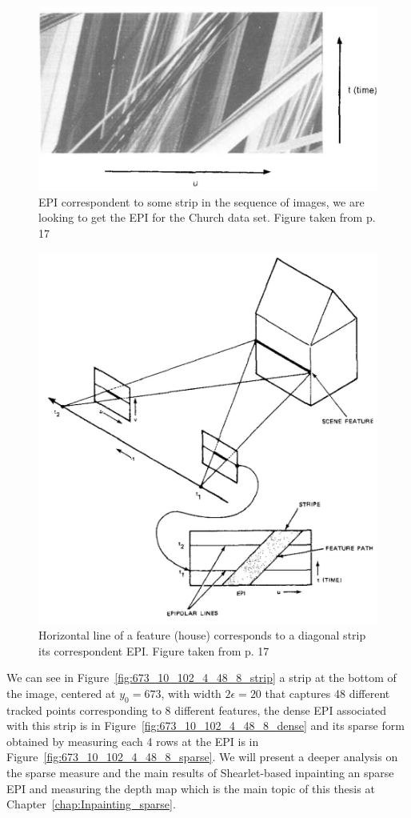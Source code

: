 \begin{figure}[h!]
\centering
\includegraphics[width = 0.8 \textwidth]{./Diagrams/EPI_bolles.jpg}
\caption{EPI correspondent to some strip in the sequence of images, we are looking to get the EPI for the Church data set. Figure taken from \cite{Bolles} p. 17}
\label{EPI_bolles}
\end{figure}

\begin{figure}[h!]
\centering
\includegraphics[width = 0.6 \textwidth]{./Diagrams/Feature_EPI_bolles.jpg}
\caption{Horizontal line of a feature (house) corresponds to a diagonal strip its correspondent EPI\@. Figure taken from \cite{Bolles} p. 17}
\label{Feature_EPI_bolles}
\end{figure}

We can see in Figure~\ref{fig:673_10_102_4_48_8_strip} a strip at the bottom of the image, centered at $y_0=673$, with width $2\epsilon=20$ that captures 48 different tracked points corresponding to 8 different features, the dense EPI associated with this strip is in Figure~\ref{fig:673_10_102_4_48_8_dense} and its sparse form obtained by measuring each 4 rows at the EPI is in Figure~\ref{fig:673_10_102_4_48_8_sparse}. We will present a deeper analysis on the sparse measure and the main results of Shearlet-based inpainting an sparse EPI and measuring the depth map which is the main topic of this thesis at Chapter~\ref{chap:Inpainting_sparse}.

